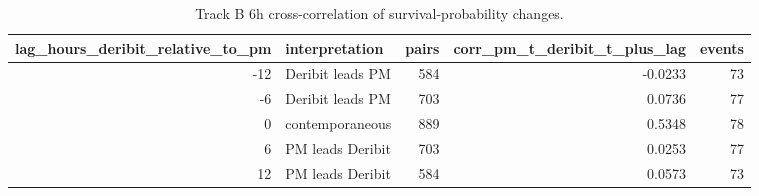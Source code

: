 \begin{table}
\caption{Track B 6h cross-correlation of survival-probability changes.}
\label{tab:trackB_cross_correlation_6h}
\begin{tabular}{rlrrr}
\toprule
lag\_hours\_deribit\_relative\_to\_pm & interpretation & pairs & corr\_pm\_t\_deribit\_t\_plus\_lag & events \\
\midrule
-12 & Deribit leads PM & 584 & -0.0233 & 73 \\
-6 & Deribit leads PM & 703 & 0.0736 & 77 \\
0 & contemporaneous & 889 & 0.5348 & 78 \\
6 & PM leads Deribit & 703 & 0.0253 & 77 \\
12 & PM leads Deribit & 584 & 0.0573 & 73 \\
\bottomrule
\end{tabular}
\end{table}
